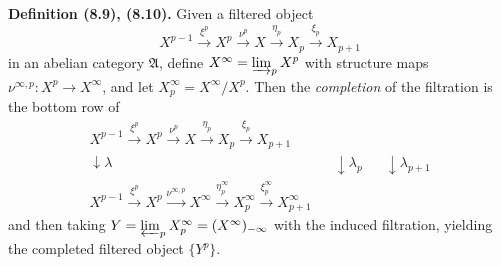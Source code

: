 \textbf{Definition (8.9), (8.10).} Given a filtered object
$$
X^{p-1} \xrightarrow{\xi^p} X^p \xrightarrow{\nu^p} X \xrightarrow{\eta_p} X_p \xrightarrow{\xi_p} X_{p+1}
$$
in an abelian category $\mathfrak{A}$, define $X^\infty = \varinjlim_p X^p$ with structure maps $\nu^{\infty, p} : X^p \to X^\infty$, and let $X^\infty_p = X^\infty / X^p$. Then the \textit{completion} of the filtration is the bottom row of
$$
\begin{array}{ccccccc}
X^{p-1} \xrightarrow{\xi^p} X^p \xrightarrow{\nu^p} X \xrightarrow{\eta_p} X_p \xrightarrow{\xi_p} X_{p+1} \\
\downarrow{\scriptstyle \lambda} && \downarrow{\scriptstyle \lambda_p} && \downarrow{\scriptstyle \lambda_{p+1}} \\
X^{p-1} \xrightarrow{\xi^p} X^p \xrightarrow{\nu^{\infty, p}} X^\infty \xrightarrow{\eta_p^\infty} X^\infty_p \xrightarrow{\xi_p^\infty} X^\infty_{p+1}
\end{array}
$$
and then taking $Y = \varprojlim_p X^\infty_p = (X^\infty)_{-\infty}$ with the induced filtration, yielding the completed filtered object $\{Y^p\}$.
